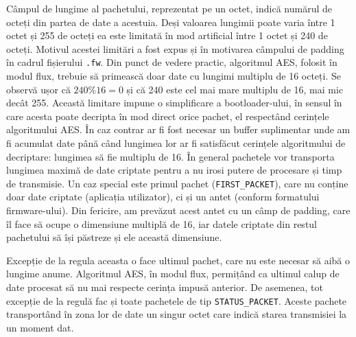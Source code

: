 \documentclass[12pt,a4paper,titlepage]{report}
\begin{document}
Câmpul de lungime al pachetului, reprezentat pe un octet, indică numărul de octeți din partea de date a acestuia. Deși valoarea lungimii poate varia între 1 octet și 255 de octeți ea este limitată în mod artificial între 1 octet și 240 de octeți. Motivul acestei limitări a fost expus și în motivarea câmpului de padding în cadrul fișierului \texttt{.fw}. Din punct de vedere practic, algoritmul AES, folosit în modul flux, trebuie să primească doar date cu lungimi multiplu de 16 octeți. Se observă ușor că \(240 \% 16 = 0\) și că 240 este cel mai mare multiplu de 16, mai mic decât 255. Această limitare impune o simplificare a bootloader-ului, în sensul în care acesta poate decripta în mod direct orice pachet, el respectând cerințele algoritmului AES. În caz contrar ar fi fost necesar un buffer suplimentar unde am fi acumulat date până când lungimea lor ar fi satisfăcut cerințele algoritmului de decriptare: lungimea să fie multiplu de 16.
În general pachetele vor transporta lungimea maximă de date criptate pentru a nu irosi putere de procesare și timp de transmisie. Un caz special este primul pachet (\texttt{FIRST\_PACKET}), care nu conține doar date criptate (aplicația utilizator), ci și un antet (conform formatului firmware-ului). Din fericire, am prevăzut acest antet cu un câmp de padding, care îl face să ocupe o dimensiune multiplă de 16, iar datele criptate din restul pachetului să își păstreze și ele această dimensiune.

Excepție de la regula aceasta o face ultimul pachet, care nu este necesar să aibă o lungime anume. Algoritmul AES, în modul flux, permițând ca ultimul calup de date procesat să nu mai respecte cerința impusă anterior. De asemenea, tot excepție de la regulă fac și toate pachetele de tip \texttt{STATUS\_PACKET}. Aceste pachete transportând în zona lor de date un singur octet care indică starea transmisiei la un moment dat.
\end{document}

